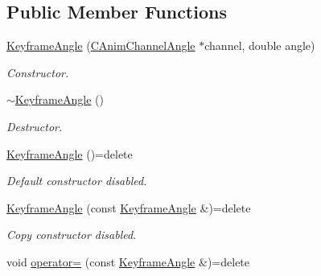 \subsection*{Public Member Functions}
\begin{DoxyCompactItemize}
\item 
\hyperlink{class_c_anim_channel_angle_1_1_keyframe_angle_a9b380a2c04fb7b7ff3c63b307308417e}{Keyframe\+Angle} (\hyperlink{class_c_anim_channel_angle}{C\+Anim\+Channel\+Angle} $\ast$channel, double angle)
\begin{DoxyCompactList}\small\item\em Constructor. \end{DoxyCompactList}\item 
\hypertarget{class_c_anim_channel_angle_1_1_keyframe_angle_a25a8c43df01c199a63ee1b31af91b92b}{\hyperlink{class_c_anim_channel_angle_1_1_keyframe_angle_a25a8c43df01c199a63ee1b31af91b92b}{$\sim$\+Keyframe\+Angle} ()}\label{class_c_anim_channel_angle_1_1_keyframe_angle_a25a8c43df01c199a63ee1b31af91b92b}

\begin{DoxyCompactList}\small\item\em Destructor. \end{DoxyCompactList}\item 
\hypertarget{class_c_anim_channel_angle_1_1_keyframe_angle_a5df8c79eb056ae196b44a46c52dfba08}{\hyperlink{class_c_anim_channel_angle_1_1_keyframe_angle_a5df8c79eb056ae196b44a46c52dfba08}{Keyframe\+Angle} ()=delete}\label{class_c_anim_channel_angle_1_1_keyframe_angle_a5df8c79eb056ae196b44a46c52dfba08}

\begin{DoxyCompactList}\small\item\em Default constructor disabled. \end{DoxyCompactList}\item 
\hypertarget{class_c_anim_channel_angle_1_1_keyframe_angle_aca6888d33728e9dd31f63ca3ff37583b}{\hyperlink{class_c_anim_channel_angle_1_1_keyframe_angle_aca6888d33728e9dd31f63ca3ff37583b}{Keyframe\+Angle} (const \hyperlink{class_c_anim_channel_angle_1_1_keyframe_angle}{Keyframe\+Angle} \&)=delete}\label{class_c_anim_channel_angle_1_1_keyframe_angle_aca6888d33728e9dd31f63ca3ff37583b}

\begin{DoxyCompactList}\small\item\em Copy constructor disabled. \end{DoxyCompactList}\item 
\hypertarget{class_c_anim_channel_angle_1_1_keyframe_angle_a2fe8576d29fba09b2b1ae03e3d6df0a0}{void \hyperlink{class_c_anim_channel_angle_1_1_keyframe_angle_a2fe8576d29fba09b2b1ae03e3d6df0a0}{operator=} (const \hyperlink{class_c_anim_channel_angle_1_1_keyframe_angle}{Keyframe\+Angle} \&)=delete}\label{class_c_anim_channel_angle_1_1_keyframe_angle_a2fe8576d29fba09b2b1ae03e3d6df0a0}


\end{DoxyCompactItemize}
